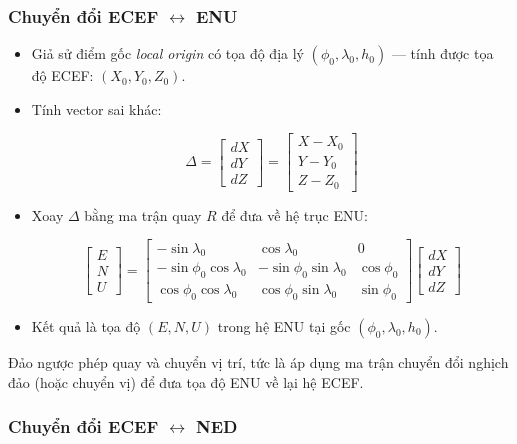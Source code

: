 \subsubsection{Chuyển đổi ECEF $\leftrightarrow$ ENU}
\begin{itemize}
  \item Giả sử điểm gốc \textit{local origin} có tọa độ địa lý $(\phi_0, \lambda_0, h_0)$ — tính được tọa độ ECEF: $(X_0, Y_0, Z_0)$.
  \item Tính vector sai khác:
  

\[
  \Delta = 
  \begin{bmatrix}
  dX \\
  dY \\
  dZ
  \end{bmatrix}
  =
  \begin{bmatrix}
  X - X_0 \\
  Y - Y_0 \\
  Z - Z_0
  \end{bmatrix}
  \]


  \item Xoay $\Delta$ bằng ma trận quay $R$ để đưa về hệ trục ENU:
  

\[
  \begin{bmatrix}
  E \\
  N \\
  U
  \end{bmatrix}
  =
  \begin{bmatrix}
  -\sin\lambda_0 & \cos\lambda_0 & 0 \\
  -\sin\phi_0\cos\lambda_0 & -\sin\phi_0\sin\lambda_0 & \cos\phi_0 \\
  \cos\phi_0\cos\lambda_0 & \cos\phi_0\sin\lambda_0 & \sin\phi_0
  \end{bmatrix}
  \begin{bmatrix}
  dX \\
  dY \\
  dZ
  \end{bmatrix}
  \]


  \item Kết quả là tọa độ $(E, N, U)$ trong hệ ENU tại gốc $(\phi_0, \lambda_0, h_0)$.
\end{itemize}

Đảo ngược phép quay và chuyển vị trí, tức là áp dụng ma trận chuyển đổi nghịch đảo (hoặc chuyển vị) để đưa tọa độ ENU về lại hệ ECEF.


\subsubsection{Chuyển đổi ECEF $\leftrightarrow$ NED}

